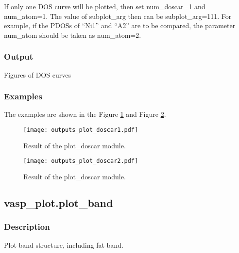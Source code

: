 \documentclass[12pt]{book}
\begin{document}
If only one DOS curve will be plotted, then set num\_doscar=1 and num\_atom=1. The value of subplot\_arg then can be  subplot\_arg=111. For example, if the PDOSs of ``Ni1'' and ``A2''  are to be compared, the parameter num\_atom should be taken as num\_atom=2.

\subsubsection{Output}
Figures of DOS curves

\subsubsection{Examples}

The examples are shown in the Figure \ref{fig:outputs_plot_doscar1} and Figure \ref{fig:outputs_plot_doscar2}.

\begin{figure}[htbp]
\centering
\texttt{[image: outputs\_plot\_doscar1.pdf]}
\caption{Result of the plot\_doscar module.}
\label{fig:outputs_plot_doscar1}
\end{figure}

\begin{figure}[htbp]
\centering
\texttt{[image: outputs\_plot\_doscar2.pdf]}
\caption{Result of the plot\_doscar module.}
\label{fig:outputs_plot_doscar2}
\end{figure}

\subsection{vasp\_plot.plot\_band}
\subsubsection{Description}
Plot band structure, including fat band.
\end{document}
